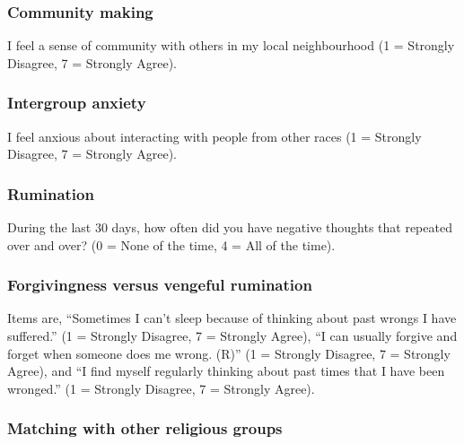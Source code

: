 \documentclass[
]{interact}
\begin{document}
\subsubsection{Community making}\label{community-making}

I feel a sense of community with others in my local neighbourhood (1 =
Strongly Disagree, 7 = Strongly Agree).

\subsubsection{Intergroup anxiety}\label{intergroup-anxiety}

I feel anxious about interacting with people from other races (1 =
Strongly Disagree, 7 = Strongly Agree).

\subsubsection{Rumination}\label{rumination}

During the last 30 days, how often did you have negative thoughts that
repeated over and over? (0 = None of the time, 4 = All of the time).

\subsubsection{Forgivingness versus vengeful
rumination}\label{forgivingness-versus-vengeful-rumination}

Items are, ``Sometimes I can't sleep because of thinking about past
wrongs I have suffered.'' (1 = Strongly Disagree, 7 = Strongly Agree),
``I can usually forgive and forget when someone does me wrong. (R)'' (1
= Strongly Disagree, 7 = Strongly Agree), and ``I find myself regularly
thinking about past times that I have been wronged.'' (1 = Strongly
Disagree, 7 = Strongly Agree).

\subsubsection{Matching with other religious
groups}\label{matching-with-other-religious-groups}
\end{document}
